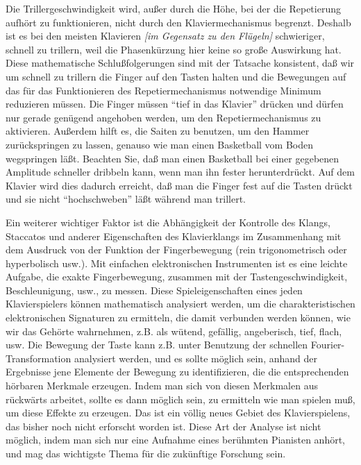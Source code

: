 Die Trillergeschwindigkeit wird, außer durch die Höhe, bei der die Repetierung aufhört zu funktionieren, nicht durch den Klaviermechanismus begrenzt.
Deshalb ist es bei den meisten Klavieren \textit{[im Gegensatz zu den Flügeln]} schwieriger, schnell zu trillern, weil die Phasenkürzung hier keine so große Auswirkung hat.
Diese mathematische Schlußfolgerungen sind mit der Tatsache konsistent, daß wir um schnell zu trillern die Finger auf den Tasten halten und die Bewegungen auf das für das Funktionieren des Repetiermechanismus notwendige Minimum reduzieren müssen.
Die Finger müssen \enquote{tief in das Klavier} drücken und dürfen nur gerade genügend angehoben werden, um den Repetiermechanismus zu aktivieren.
Außerdem hilft es, die Saiten zu benutzen, um den Hammer zurückspringen zu lassen, genauso wie man einen Basketball vom Boden wegspringen läßt.
Beachten Sie, daß man einen Basketball bei einer gegebenen Amplitude schneller dribbeln kann, wenn man ihn fester herunterdrückt.
Auf dem Klavier wird dies dadurch erreicht, daß man die Finger fest auf die Tasten drückt und sie nicht \enquote{hochschweben} läßt während man trillert.

Ein weiterer wichtiger Faktor ist die Abhängigkeit der Kontrolle des Klangs, Staccatos und anderer Eigenschaften des Klavierklangs im Zusammenhang mit dem Ausdruck von der Funktion der Fingerbewegung (rein trigonometrisch oder hyperbolisch usw.).
Mit einfachen elektronischen Instrumenten ist es eine leichte Aufgabe, die exakte Fingerbewegung, zusammen mit der Tastengeschwindigkeit, Beschleunigung, usw., zu messen.
Diese Spieleigenschaften eines jeden Klavierspielers können mathematisch analysiert werden, um die charakteristischen elektronischen Signaturen zu ermitteln, die damit verbunden werden können, wie wir das Gehörte wahrnehmen, z.B. als wütend, gefällig, angeberisch, tief, flach, usw.
Die Bewegung der Taste kann z.B. unter Benutzung der schnellen Fourier-Transformation analysiert werden, und es sollte möglich sein, anhand der Ergebnisse jene Elemente der Bewegung zu identifizieren, die die entsprechenden hörbaren Merkmale erzeugen.
Indem man sich von diesen Merkmalen aus rückwärts arbeitet, sollte es dann möglich sein, zu ermitteln wie man spielen muß, um diese Effekte zu erzeugen.
Das ist ein völlig neues Gebiet des Klavierspielens, das bisher noch nicht erforscht worden ist.
Diese Art der Analyse ist nicht möglich, indem man sich nur eine Aufnahme eines berühmten Pianisten anhört, und mag das wichtigste Thema für die zukünftige Forschung sein.



